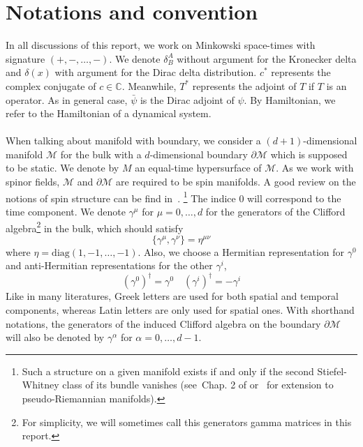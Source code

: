 \section*{Notations and convention}
In all discussions of this report, we work on Minkowski space-times with signature $(+, -,\ldots, -)$.
We denote $\delta^A_B$ without argument for the Kronecker delta and $\delta(x)$ with argument for the Dirac delta distribution.
$c^*$ represents the complex conjugate of $c\in\mathbb{C}$. 
Meanwhile, $T^*$ represents the adjoint of $T$ if $T$ is an operator.
As in general case, $\bar{\psi}$ is the Dirac adjoint of $\psi$.
By Hamiltonian, we refer to the Hamiltonian of a dynamical system.
\\\\ 
When talking about manifold with boundary, we consider a $(d+1)$-dimensional manifold $\mathcal{M}$ for the bulk with a $d$-dimensional boundary $\partial \mathcal{M}$ which is supposed to be static.
We denote by $M$ an equal-time hypersurface of $\mathcal{M}$.
As we work with spinor fields, $\mathcal{M}$ and $\partial \mathcal{M}$ are required to be spin manifolds. 
A good review on the notions of spin structure can be find in~\cite{Trautman2007}.
\footnote{
Such a structure on a given manifold exists if and only if the second Stiefel-Whitney class of its bundle vanishes (see~\eg Chap. 2 of \cite{Lawson1989} or~\cite{Alagia1985} for extension to pseudo-Riemannian manifolds).}
%
The indice 0 will correspond to the time component.
We denote $\gamma^\mu$ for $\mu = 0, \ldots, d$ for the generators of the Clifford algebra\footnote{
For simplicity, we will sometimes call this generators gamma matrices in this report.
} in the bulk, which should satisfy
\begin{equation*}
\{ \gamma^\mu, \gamma^\nu \} = \eta^{\mu\nu}
\end{equation*} 
where $\eta = \mathrm{diag}(1, -1 ,\ldots, -1)$.
Also, we choose a Hermitian representation for $\gamma^0$ and anti-Hermitian representations for the other $\gamma^i$, 
\ie
\begin{equation*}
(\gamma^0)^\dagger = \gamma^0 \quad
(\gamma^i)^\dagger = -\gamma^i
\end{equation*}
Like in many literatures, Greek letters are used for both spatial and temporal components, whereas Latin letters are only used for spatial ones.
With shorthand notations, the generators of the induced Clifford algebra on the boundary $\partial \mathcal{M}$ will also be denoted by $\gamma^\alpha$ for $\alpha = 0 ,\ldots, d-1$. 

